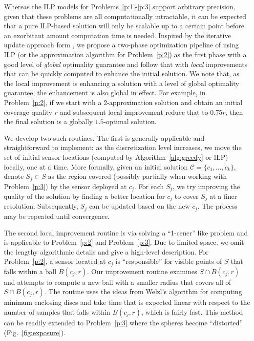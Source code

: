 Whereas the ILP models for Problems~\ref{p:1}-\ref{p:3} support arbitrary precision, given that these problems are all computationally intractable, it can be expected that a pure ILP-based solution will only be scalable up to a certain point before an exorbitant amount computation time is needed. Inspired by the iterative update approach form \cite{cortes2004coverage}, we propose a two-phase optimization pipeline of using ILP (or the approximation algorithm for Problem~\ref{p:2}) as the first phase with a good level of \emph{global} optimality guarantee and follow that with \emph{local} improvements that can be quickly computed to enhance the initial solution. We note that, as the local improvement is enhancing a solution with a level of global optimality guarantee, the enhancement is also global in effect. For example, in Problem~\ref{p:2}, if we start with a $2$-approximation solution and obtain an initial coverage quality $r$ and subsequent local improvement reduce that to $0.75r$, then the final solution is a globally $1.5$-optimal solution.

We develop two such routines. The first is generally applicable and straightforward to implement: as the discretization level increases, we move the set of initial sensor locations (computed by Algorithm~\ref{alg:greedy} or ILP) locally, one at a time. More formally, given an initial solution $\mathcal C = \{c_1, \dots, c_k\}$, denote $S_j \subset S$ as the region covered (possibly partially when working with Problem~\ref{p:3}) by the sensor deployed at $c_j$. For each $S_j$, we try improving the quality of the solution by finding a better location for $c_j$ to cover $S_j$ at a finer resolution. Subsequently, $S_j$ can be updated based on the new $c_j$. The process may be repeated until convergence. 

The second local improvement routine is via solving a ``1-cener'' like problem and is applicable to Problem~\ref{p:2} and Problem~\ref{p:3}. Due to limited space, we omit the lengthy algorithmic details and give a high-level description. For Problem~\ref{p:2}, a sensor located at $c_j$ is ``responsible'' for visible points of $S$ that falls within a ball $B(c_j, r)$. Our improvement routine examines $S \cap B(c_j, r)$ and attempts to compute a new ball with a smaller radius that covers all of $S \cap B(c_j, r)$. The routine uses the ideas from Welzl's algorithm for computing minimum enclosing discs \cite{welzl1991smallest, Mark1997computation} and take time that is expected linear with respect to the number of samples that falls within $B(c_j, r)$, which is fairly fast. This method can be readily extended to Problem~\ref{p:3} where the spheres become ``distorted'' (Fig.~\ref{fig:exposure}).
